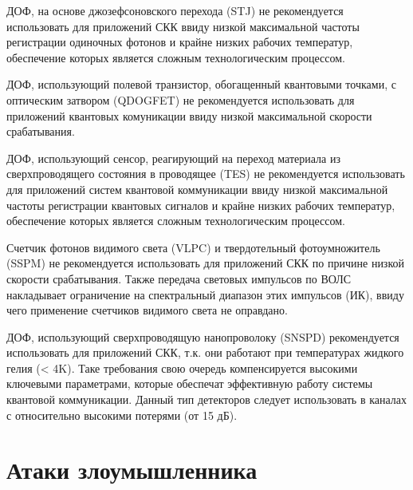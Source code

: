 ДОФ, на основе джозефсоновского перехода (STJ) не рекомендуется использовать для приложений СКК ввиду низкой максимальной частоты регистрации одиночных фотонов и крайне низких рабочих температур, обеспечение которых является сложным технологическим процессом.


ДОФ, использующий полевой транзистор, обогащенный квантовыми точками, с оптическим затвором (QDOGFET) не рекомендуется использовать для приложений квантовых комуникации ввиду низкой максимальной скорости срабатывания.


ДОФ, использующий сенсор, реагирующий на переход материала из сверхпроводящего состояния в проводящее (TES) не рекомендуется использовать для приложений систем квантовой коммуникации ввиду низкой максимальной частоты регистрации квантовых сигналов и крайне низких рабочих температур, обеспечение которых является сложным технологическим процессом.


Счетчик фотонов видимого света (VLPC) и твердотельный фотоумножитель (SSPM) не рекомендуется использовать для приложений СКК по причине низкой скорости срабатывания. Также передача световых импульсов по ВОЛС накладывает ограничение на спектральный диапазон этих импульсов (ИК), ввиду чего применение счетчиков видимого света не оправдано.


ДОФ, использующий сверхпроводящую нанопроволоку (SNSPD) рекомендуется использовать для приложений СКК, т.\:к. они работают при температурах жидкого гелия (< 4K). Таке требования свою очередь компенсируется высокими ключевыми параметрами, которые обеспечат эффективную работу системы квантовой коммуникации. Данный тип детекторов следует использовать в каналах с относительно высокими потерями (от 15 дБ). 


\section{Атаки злоумышленника} \label{sec:ch1/sec6} 

